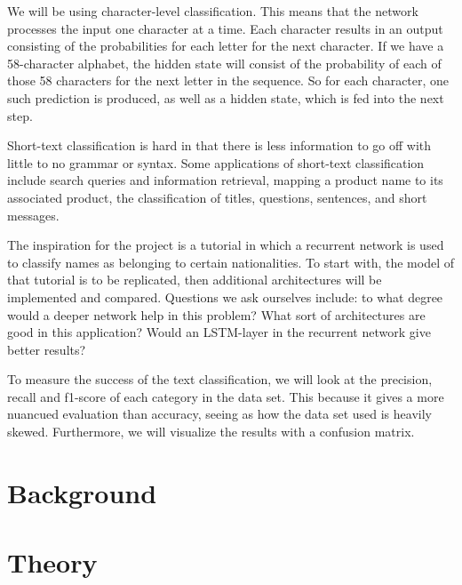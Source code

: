 \documentclass[runningheads]{llncs}
\begin{document}
We will be using character-level classification. This means that the network processes the input one character at a time. Each character results in an output consisting of the probabilities for each letter for the next character. If we have a 58-character alphabet, the hidden state will consist of the probability of each of those 58 characters for the next letter in the sequence. So for each character, one such prediction is produced, as well as a hidden state, which is fed into the next step.

Short-text classification is hard in that there is less information to go off with little to no grammar or syntax. Some applications of short-text classification include search queries and information retrieval, mapping a product name to its associated product, the classification of titles, questions, sentences, and short messages.

The inspiration for the project is a tutorial in which a recurrent network is used to classify names as belonging to certain nationalities. To start with, the model of that tutorial is to be replicated, then additional architectures will be implemented and compared. Questions we ask ourselves include: to what degree would a deeper network help in this problem? What sort of architectures are good in this application? Would an LSTM-layer in the recurrent network give better results? 

To measure the success of the text classification, we will look at the precision, recall and f1-score of each category in the data set. This because it gives a more nuancued evaluation than accuracy, seeing as how the data set used is heavily skewed. Furthermore, we will visualize the results with a confusion matrix.


\section{Background}


\section{Theory}
\end{document}
